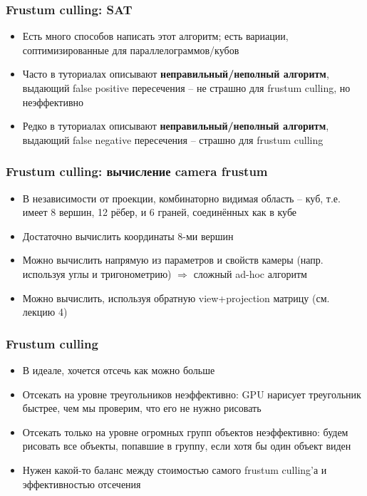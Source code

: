 \documentclass{beamer}
\begin{document}
\begin{frame}[fragile]
\frametitle{Frustum culling: SAT}
\begin{itemize}
\item Есть много способов написать этот алгоритм; есть вариации, соптимизированные для параллелограммов/кубов
\item Часто в туториалах описывают \textbf{неправильный/неполный алгоритм}, выдающий false positive пересечения -- не страшно для frustum culling, но неэффективно
\item Редко в туториалах описывают \textbf{неправильный/неполный алгоритм}, выдающий false negative пересечения -- страшно для frustum culling
\end{itemize}
\end{frame}

\begin{frame}[fragile]
\frametitle{Frustum culling: вычисление camera frustum}
\begin{itemize}
\item В независимости от проекции, комбинаторно видимая область -- куб, т.е. имеет 8 вершин, 12 рёбер, и 6 граней, соединённых как в кубе
\pause
\item Достаточно вычислить координаты 8-ми вершин
\pause
\item Можно вычислить напрямую из параметров и свойств камеры (напр. используя углы и тригонометрию) \begin{math}\Longrightarrow\end{math} сложный ad-hoc алгоритм
\pause
\item Можно вычислить, используя обратную view+projection матрицу (см. лекцию 4)
\end{itemize}
\end{frame}

\begin{frame}[fragile]
\frametitle{Frustum culling}
\begin{itemize}
\item В идеале, хочется отсечь как можно больше
\pause
\item Отсекать на уровне треугольников неэффективно: GPU нарисует треугольник быстрее, чем мы проверим, что его не нужно рисовать
\pause
\item Отсекать только на уровне огромных групп объектов неэффективно: будем рисовать все объекты, попавшие в группу, если хотя бы один объект виден
\pause
\item Нужен какой-то баланс между стоимостью самого frustum culling'а и эффективностью отсечения
\end{itemize}
\end{frame}
\end{document}
